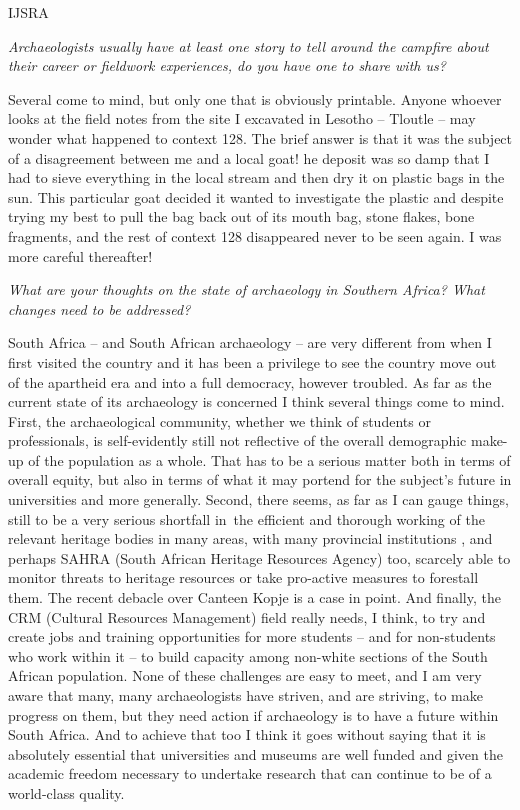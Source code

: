 \documentclass[%
	]{ijsra}
\begin{document}
\begin{labeling}{IJSRA}
\item[IJSRA] \emph{Archaeologists usually have at least one story to tell around the campfire about their career or fieldwork experiences, do you have one to share with us?}
	
\item[PM] 
Several come to mind, but only one that is obviously printable. Anyone whoever looks at the field notes from the site I excavated in Lesotho – Tloutle – may wonder what happened to context 128. The brief answer is that it was the subject of a disagreement between me and a local goat! he deposit was so damp that I had to sieve everything in the local stream and then dry it on plastic bags in the sun. This particular goat decided it wanted to investigate the plastic and despite trying my best to pull the bag back out of its mouth bag, stone flakes, bone fragments, and the rest of context 128 disappeared never to be seen again. I was more careful thereafter!


\item[IJSRA] \emph{What are your thoughts on the state of archaeology in Southern Africa? What changes need to be addressed?}
	
\item[PM] 
South Africa – and South African archaeology – are very different from when I first visited the country and it has been a privilege to see the country move out of the apartheid era and into a full democracy, however troubled. As far as the current state of its archaeology is concerned I think several things come to mind. First, the archaeological community, whether we think of students or professionals, is self-evidently still not reflective of the overall demographic make-up of the population as a whole. That has to be a serious matter both in terms of overall equity, but also in terms of what it may portend for the subject’s future in universities and more generally. Second, there seems, as far as I can gauge things, still to be a very serious shortfall in the efficient and thorough working of the relevant heritage bodies in many areas, with many provincial institutions , and perhaps SAHRA (South African Heritage Resources Agency) too, scarcely able to monitor threats to heritage resources or take pro-active measures to forestall them. The recent debacle over Canteen Kopje is a case in point. And finally, the CRM (Cultural Resources Management) field really needs, I think, to try and create jobs and training opportunities for more students – and for non-students who work within it – to build capacity among non-white sections of the South African population. None of these challenges are easy to meet, and I am very aware that many, many archaeologists have striven, and are striving, to make progress on them, but they need action if archaeology is to have a future within South Africa. And to achieve that too I think it goes without saying that it is absolutely essential that universities and museums are well funded and given the academic freedom necessary to undertake research that can continue to be of a world-class quality.


\end{labeling}
\end{document}
